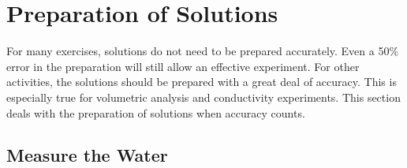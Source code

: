 \chapter{Preparation of Solutions} 
\label{cha:prep-solutions}

For many exercises, solutions do not need to be prepared accurately. Even a 50\% error in the preparation will still allow an effective experiment. For other activities, the solutions should be prepared with a great deal of accuracy. This is especially true for volumetric analysis and conductivity experiments. This section deals with the preparation of solutions when accuracy counts.

\section{Measure the Water}

